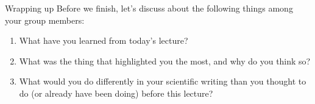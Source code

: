 \documentclass{beamer}
\begin{document}
\begin{frame}{Wrapping up}
Before we finish, let's discuss about the following things among your group members:
\begin{enumerate}
    \item What have you learned from today's lecture?
    \item What was the thing that highlighted you the most, and why do you think so?
    \item What would you do differently in your scientific writing than you thought to do (or already have been doing) before this lecture?
\end{enumerate}
\end{frame}

\begin{frame}
\end{frame}  
\end{document}
